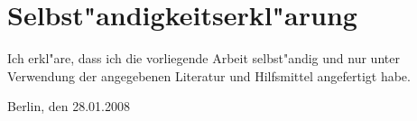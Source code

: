 \chapter*{Selbst"andigkeitserkl"arung}

Ich erkl"are, dass ich die vorliegende Arbeit selbst"andig und nur unter Verwendung der angegebenen Literatur und Hilfsmittel angefertigt habe.

\vspace{2\baselineskip}
\noindent Berlin, den 28.01.2008\hfill\authorfirstname \authorsurname